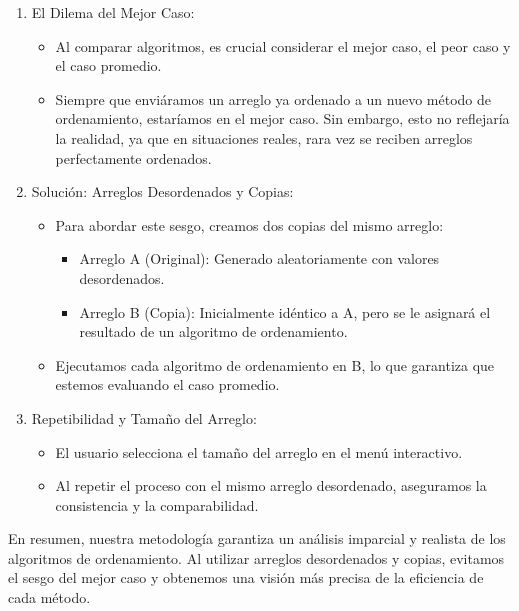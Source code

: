 \documentclass[12pt]{article}
\begin{document}
\par\vspace{0.4cm}
\begin{enumerate}
    \item El Dilema del Mejor Caso:
          \begin{itemize}
              \item Al comparar algoritmos, es crucial considerar el mejor caso, el peor caso y el caso promedio.
              \item Siempre que enviáramos un arreglo ya ordenado a un nuevo método de ordenamiento, estaríamos en el mejor caso. Sin embargo, esto no reflejaría la realidad, ya que en situaciones reales, rara vez se reciben arreglos perfectamente ordenados.
          \end{itemize}
    \item Solución: Arreglos Desordenados y Copias:
          \begin{itemize}
              \item Para abordar este sesgo, creamos dos copias del mismo arreglo:
                    \begin{itemize}
                        \item Arreglo A (Original): Generado aleatoriamente con valores desordenados.
                        \item Arreglo B (Copia): Inicialmente idéntico a A, pero se le asignará el resultado de un algoritmo de ordenamiento.
                    \end{itemize}
              \item Ejecutamos cada algoritmo de ordenamiento en B, lo que garantiza que estemos evaluando el caso promedio.
          \end{itemize}
    \item Repetibilidad y Tamaño del Arreglo:
          \begin{itemize}
              \item El usuario selecciona el tamaño del arreglo en el menú interactivo.
              \item Al repetir el proceso con el mismo arreglo desordenado, aseguramos la consistencia y la comparabilidad.
          \end{itemize}
\end{enumerate}
\par\vspace{0.4cm}
En resumen, nuestra metodología garantiza un análisis imparcial y realista de los algoritmos de ordenamiento. Al utilizar arreglos desordenados y copias, evitamos el sesgo del mejor caso y obtenemos una visión más precisa de la eficiencia de cada método.
\end{document}
